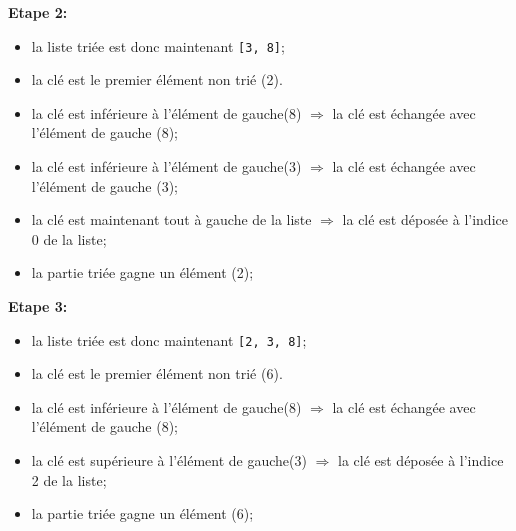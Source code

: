 \textbf{Etape 2:}


\begin{itemize}
	\item la liste triée est donc maintenant \verb|[3, 8]|;
	\item la clé est le premier élément non trié (2).
	\item la clé est inférieure à l'élément de gauche(8) $\Rightarrow$ la clé est échangée avec l'élément de gauche (8);
	\item la clé est inférieure à l'élément de gauche(3) $\Rightarrow$ la clé est échangée avec l'élément de gauche (3);
	\item la clé est maintenant tout à gauche de la liste $\Rightarrow$ la clé est déposée à l'indice 0 de la liste;
	\item la partie triée gagne un élément (2);
\end{itemize}

\textbf{Etape 3:}

\begin{itemize}
	\item la liste triée est donc maintenant \verb|[2, 3, 8]|;
	\item la clé est le premier élément non trié (6).
	\item la clé est inférieure à l'élément de gauche(8) $\Rightarrow$ la clé est échangée avec l'élément de gauche (8);
	\item la clé est supérieure à l'élément de gauche(3) $\Rightarrow$ la clé est déposée à l'indice 2 de la liste;
	\item la partie triée gagne un élément (6);
\end{itemize}


